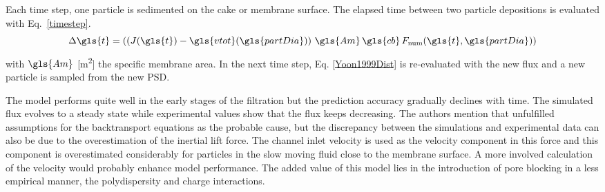 Each time step, one particle is sedimented on the cake or membrane surface. The elapsed time between two particle depositions is evaluated with Eq.\ \ref{timestep}. 
\begin{equation}
\Delta \gls{t} =\left( \left( J(\gls{t}) - \gls{vtot}(\gls{partDia})\right)\, \gls{Am} \, \gls{cb}\, F_{\mathrm{num}}(\gls{t},\gls{partDia}) \right)
\label{timestep}
\end{equation}
with $\gls{Am}$ [\unit{\metre\squared}] the specific membrane area.
In the next time step, Eq. \ref{Yoon1999Dist} is re-evaluated with the new flux and a new particle is sampled from the new \gls{PSD}.\par
The model performs quite well in the early stages of the filtration but the prediction accuracy gradually declines with time. The simulated flux evolves to a steady state while experimental values show that the flux keeps decreasing. The authors mention that unfulfilled assumptions for the backtransport equations as the probable cause, but the discrepancy between the simulations and experimental data can also be due to the overestimation of the inertial lift force. The channel inlet velocity is used as the velocity component in this force and this component is overestimated considerably for particles in the slow moving fluid close to the membrane surface. A more involved calculation of the velocity would probably enhance model performance. The added value of this model lies in the introduction of pore blocking in a less empirical manner, the polydispersity and charge interactions.\\ \\


